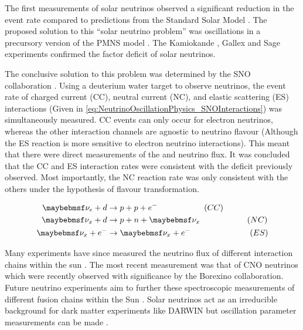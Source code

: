 The first measurements of solar neutrinos observed a significant reduction in the event rate compared to predictions from the Standard Solar Model \cite{PhysRevLett.20.1205, Vinyoles2017-vv}. The proposed solution to this ``solar neutrino problem'' was  oscillations in a precursory version of the PMNS model \cite{Gribov1969-xi}. The Kamiokande \cite{PhysRevLett.63.16}, Gallex \cite{Hampel1999-of} and Sage \cite{PhysRevC.60.055801} experiments confirmed the  factor deficit of solar neutrinos.

The conclusive solution to this problem was determined by the SNO collaboration \cite{Ahmad2002-zv}. Using a deuterium water target to observe  neutrinos, the event rate of charged current (CC), neutral current (NC), and elastic scattering (ES) interactions (Given in \autoref{eq:NeutrinoOscillationPhysics_SNOInteractions}) was simultaneously measured. CC events can only occur for electron neutrinos, whereas the other interaction channels are agnostic to neutrino flavour (Although the ES reaction is more sensitive to electron neutrino interactions). This meant that there were direct measurements of the  and  neutrino flux. It was concluded that the CC and ES interaction rates were consistent with the deficit previously observed. Most importantly, the NC reaction rate was only consistent with the others under the hypothesis of flavour transformation.

\begin{equation}
  \label{eq:NeutrinoOscillationPhysics_SNOInteractions}
  \begin{split}
    \nu_{e} + d &\rightarrow p + p + e^{-} \hspace{2cm} (CC) \\
    \nu_{x} + d &\rightarrow p + n + \nu_{x} \hspace{2.02cm} (NC) \\
    \nu_{x} + e^{-} &\rightarrow \nu_{x} + e^{-} \hspace{2.55cm} (ES)
  \end{split}
\end{equation}

Many experiments have since measured the neutrino flux of different interaction chains within the sun \cite{Borexino_Collaboration2018-of, Aharmim2006-yb, Agostini2020-so}. The most recent measurement was that of CNO neutrinos which were recently observed with \quickmath{5\sigma} significance by the Borexino collaboration. Future neutrino experiments aim to further these spectroscopic measurements of different fusion chains within the Sun \cite{Andringa2016-zd, Beacom2017-ff, An2016-gm}. Solar neutrinos act as an irreducible background for dark matter experiments like DARWIN but oscillation parameter measurements can be made \cite{aalbers2020solar}.


